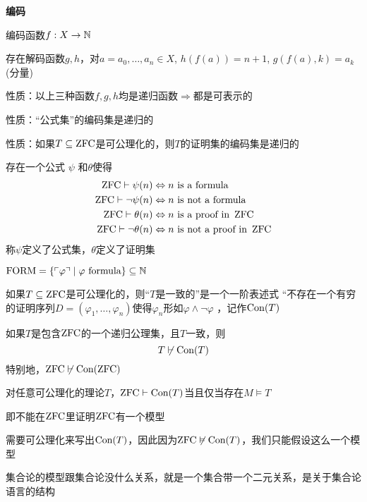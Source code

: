 \documentclass[11pt]{article}
\def \FORM {\text{FORM}}
\begin{document}
\textbf{编码}

编码函数\(f:X\to\mathbb{N}\)

存在解码函数\(g,h\)，对\(a=a_0,\dots,a_n\in X\), \(h(f(a))=n+1\), \(g(f(a),k)=a_k\) (分量)

性质：以上三种函数\(f,g,h\)均是递归函数\(\Rightarrow\)都是可表示的

性质：“公式集”的编码集是递归的

性质：如果\(T\subseteq\operatorname{ZFC}\)是可公理化的，则\(T\)的证明集的编码集是递归的

\begin{corollary}[]
存在一个公式 \(\psi\) 和\(\theta\)使得
\begin{align*}
\operatorname{ZFC}\vdash\psi(n)&\Leftrightarrow n\text{ is a formula}\\
\operatorname{ZFC}\vdash\neg\psi(n)&\Leftrightarrow n\text{ is not a formula}\\
\operatorname{ZFC}\vdash\theta(n)&\Leftrightarrow n\text{ is a proof in }\operatorname{ZFC}\\
\operatorname{ZFC}\vdash\neg\theta(n)&\Leftrightarrow n\text{ is not a proof in }\operatorname{ZFC}\\
\end{align*}
称\(\psi\)定义了公式集，\(\theta\)定义了证明集
\end{corollary}

\(\FORM=\{\ucorner{\varphi}\mid\varphi\text{ formula}\}\subseteq\N\)

    如果\(T\subseteq\operatorname{ZFC}\)是可公理化的，则“\(T\)是一致的”是一个一阶表述式
    “不存在一个有穷的证明序列\(D=(\varphi_1,\dots,\varphi_n)\)使得\(\varphi_n\)形如\(\varphi\wedge\neg\varphi\)
，记作\(\text{Con}(T)\)

\begin{theorem}[第二不完全]
如果\(T\)是包含\(\operatorname{ZFC}\)的一个递归公理集，且\(T\)一致，则
\begin{equation*}
T\not\vdash\text{Con}(T)
\end{equation*}
特别地，\(\operatorname{ZFC}\not\vdash\text{Con}(\operatorname{ZFC})\)
\end{theorem}

\begin{theorem}[]
对任意可公理化的理论\(T\)，\(\operatorname{ZFC}\vdash\text{Con}(T)\)当且仅当存在\(M\vDash T\)
\end{theorem}

即不能在\(\operatorname{ZFC}\)里证明\(\operatorname{ZFC}\)有一个模型

需要可公理化来写出\(\text{Con}(T)\)，因此因为\(\operatorname{ZFC}\not\vDash\text{Con}(T)\)，我们只能假设这么一个模型

集合论的模型跟集合论没什么关系，就是一个集合带一个二元关系，是关于集合论语言的结构
\end{document}
